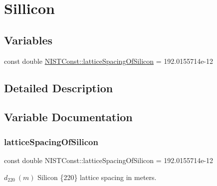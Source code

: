 \hypertarget{group___sillicon}{}\section{Sillicon}
\label{group___sillicon}
\subsection*{Variables}
\begin{DoxyCompactItemize}
\item 
const double \hyperlink{group___sillicon_ga439c53134da8a910d17c996b136da7a8}{N\+I\+S\+T\+Const\+::lattice\+Spacing\+Of\+Silicon} = 192.\+0155714e-\/12
\end{DoxyCompactItemize}


\subsection{Detailed Description}


\subsection{Variable Documentation}
\mbox{\label{group___sillicon_ga439c53134da8a910d17c996b136da7a8}} 
\subsubsection{\texorpdfstring{lattice\+Spacing\+Of\+Silicon}{latticeSpacingOfSilicon}}
{\footnotesize\ttfamily const double N\+I\+S\+T\+Const\+::lattice\+Spacing\+Of\+Silicon = 192.\+0155714e-\/12}

$d_{220} \ (m)$ Silicon \{220\} lattice spacing in meters. 